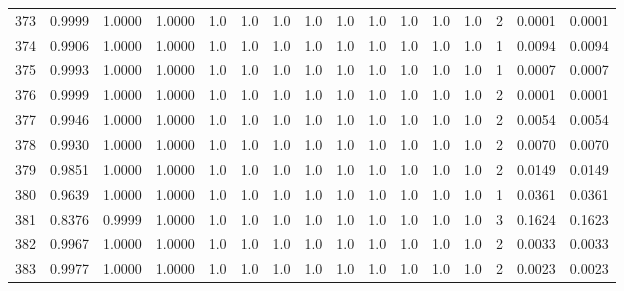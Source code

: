\begin{tabular}{lrrrrrrrrrrrrrrr}
373 &      0.9999 &  1.0000 &  1.0000 &     1.0 &     1.0 &     1.0 &     1.0 &     1.0 &     1.0 &     1.0 &      1.0 &        1.0 &      2 &                    0.0001 &                     0.0001 \\
374 &      0.9906 &  1.0000 &  1.0000 &     1.0 &     1.0 &     1.0 &     1.0 &     1.0 &     1.0 &     1.0 &      1.0 &        1.0 &      1 &                    0.0094 &                     0.0094 \\
375 &      0.9993 &  1.0000 &  1.0000 &     1.0 &     1.0 &     1.0 &     1.0 &     1.0 &     1.0 &     1.0 &      1.0 &        1.0 &      1 &                    0.0007 &                     0.0007 \\
376 &      0.9999 &  1.0000 &  1.0000 &     1.0 &     1.0 &     1.0 &     1.0 &     1.0 &     1.0 &     1.0 &      1.0 &        1.0 &      2 &                    0.0001 &                     0.0001 \\
377 &      0.9946 &  1.0000 &  1.0000 &     1.0 &     1.0 &     1.0 &     1.0 &     1.0 &     1.0 &     1.0 &      1.0 &        1.0 &      2 &                    0.0054 &                     0.0054 \\
378 &      0.9930 &  1.0000 &  1.0000 &     1.0 &     1.0 &     1.0 &     1.0 &     1.0 &     1.0 &     1.0 &      1.0 &        1.0 &      2 &                    0.0070 &                     0.0070 \\
379 &      0.9851 &  1.0000 &  1.0000 &     1.0 &     1.0 &     1.0 &     1.0 &     1.0 &     1.0 &     1.0 &      1.0 &        1.0 &      2 &                    0.0149 &                     0.0149 \\
380 &      0.9639 &  1.0000 &  1.0000 &     1.0 &     1.0 &     1.0 &     1.0 &     1.0 &     1.0 &     1.0 &      1.0 &        1.0 &      1 &                    0.0361 &                     0.0361 \\
381 &      0.8376 &  0.9999 &  1.0000 &     1.0 &     1.0 &     1.0 &     1.0 &     1.0 &     1.0 &     1.0 &      1.0 &        1.0 &      3 &                    0.1624 &                     0.1623 \\
382 &      0.9967 &  1.0000 &  1.0000 &     1.0 &     1.0 &     1.0 &     1.0 &     1.0 &     1.0 &     1.0 &      1.0 &        1.0 &      2 &                    0.0033 &                     0.0033 \\
383 &      0.9977 &  1.0000 &  1.0000 &     1.0 &     1.0 &     1.0 &     1.0 &     1.0 &     1.0 &     1.0 &      1.0 &        1.0 &      2 &                    0.0023 &                     0.0023 \\

\end{tabular}

